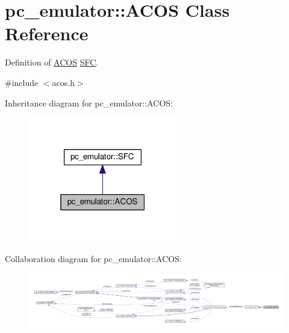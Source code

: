 \hypertarget{classpc__emulator_1_1ACOS}{}\section{pc\+\_\+emulator\+:\+:A\+C\+OS Class Reference}
\label{classpc__emulator_1_1ACOS}


Definition of \hyperlink{classpc__emulator_1_1ACOS}{A\+C\+OS} \hyperlink{classpc__emulator_1_1SFC}{S\+FC}.  




{\ttfamily \#include $<$acos.\+h$>$}



Inheritance diagram for pc\+\_\+emulator\+:\+:A\+C\+OS\+:\nopagebreak
\begin{figure}[H]
\begin{center}
\leavevmode
\includegraphics[width=184pt]{classpc__emulator_1_1ACOS__inherit__graph}
\end{center}
\end{figure}


Collaboration diagram for pc\+\_\+emulator\+:\+:A\+C\+OS\+:\nopagebreak
\begin{figure}[H]
\begin{center}
\leavevmode
\includegraphics[width=350pt]{classpc__emulator_1_1ACOS__coll__graph}
\end{center}
\end{figure}
